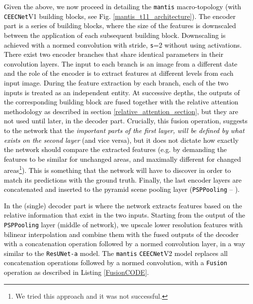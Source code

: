 \documentclass[times, 5p]{elsarticle}
\newcommand{\ceecnet}{\texttt{CEECNet}}
\newcommand{\mantis}{\texttt{mantis}}
\begin{document}
\textcolor{black}{
Given the above, we now proceed in detailing the \mantis{} macro-topology (with \ceecnet V1 building blocks, see Fig. \ref{mantis_t11_architecture}). 
The encoder part is a series of building blocks, where the size of the features is downscaled between the application of each subsequent building block. Downscaling is achieved with a normed convolution with stride, \texttt{s}=2 without using activations.  There exist two encoder branches that share identical  parameters in their convolution layers. The input to each branch is an image from a different date and the role of the encoder is to extract features at different levels from each input image. During the feature extraction by each branch, each of the two inputs is treated as an independent entity. At successive depths, the  outputs of the corresponding building block are fused together with the relative attention methodology as described in section \ref{relative_attention_section}, but they are not used until later, in the decoder part. Crucially, this fusion operation, suggests to the network that the \emph{important parts of the first layer, will be defined by what exists on the second layer} (and vice versa),  but it does not dictate how exactly  the network should compare the extracted features (e.g. by demanding  the features to be similar for unchanged areas, and maximally different for changed areas\footnote{We tried this approach and it was not successful.}). This is something that the network will have to discover in order to match its predictions with the ground truth. Finally, the last encoder layers are concatenated and inserted to the pyramid scene pooling layer (\texttt{PSPPooling}  --    \citealt{DIAKOGIANNIS202094,zhao2017pspnet}).}

\textcolor{black}{
In the (single) decoder part is where the network extracts features based on the relative information that exist in the two inputs. Starting from the output of the \texttt{PSPPooling} layer (middle of network), we upscale lower resolution features
with bilinear interpolation and combine them with the fused outputs of the decoder with a concatenation operation followed by a normed convolution layer, in a way similar to the \texttt{ResUNet-a} \citep{DIAKOGIANNIS202094} model. The \mantis{} \ceecnet V2 model replaces all concatenation operations followed by a normed convolution, with a \texttt{Fusion} operation as described in Listing \ref{FusionCODE}.} 
\end{document}
